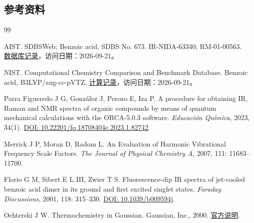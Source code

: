 \documentclass[a4paper,12pt]{article}
\newcommand{\wuhao}{\fontsize{10.5pt}{15.75pt}\selectfont}
\begin{document}
\subsection{参考资料}
\begingroup
\renewcommand{\section}[2]{}
\begin{thebibliography}{99}\wuhao

 AIST. SDBSWeb: Benzoic acid, SDBS No. 673. IR-NIDA-63340; RM-01-00563. \href{https://sdbs.db.aist.go.jp/CompoundLanding.aspx?sdbsno=673}{数据库记录}，访问日期：2026-09-21。

 NIST. Computational Chemistry Comparison and Benchmark Database. Benzoic acid, B3LYP/aug-cc-pVTZ. \href{https://cccbdb.nist.gov/energy3x.asp?basis=18&casno=65850&method=8}{计算记录}，访问日期：2026-09-21。

 Parra Figueredo J G, González J, Perozo E, Iza P. A procedure for obtaining IR, Raman and NMR spectra of organic compounds by means of quantum mechanical calculations with the ORCA-5.0.3 software. \emph{Educación Química}, 2023, 34(1). \href{https://doi.org/10.22201/fq.18708404e.2023.1.82742}{DOI: 10.22201/fq.18708404e.2023.1.82742}.

 Merrick J P, Moran D, Radom L. An Evaluation of Harmonic Vibrational Frequency Scale Factors. \emph{The Journal of Physical Chemistry A}, 2007, 111: 11683–11700.

 Florio G M, Sibert E L III, Zwier T S. Fluorescence-dip IR spectra of jet-cooled benzoic acid dimer in its ground and first excited singlet states. \emph{Faraday Discussions}, 2001, 118: 315–330. \href{https://doi.org/10.1039/b009594j}{DOI: 10.1039/b009594j}.

 Ochterski J W. Thermochemistry in Gaussian. Gaussian, Inc., 2000. \href{https://gaussian.com/wp-content/uploads/dl/thermo.pdf}{官方说明}.

\end{thebibliography}
\endgroup
\end{document}
